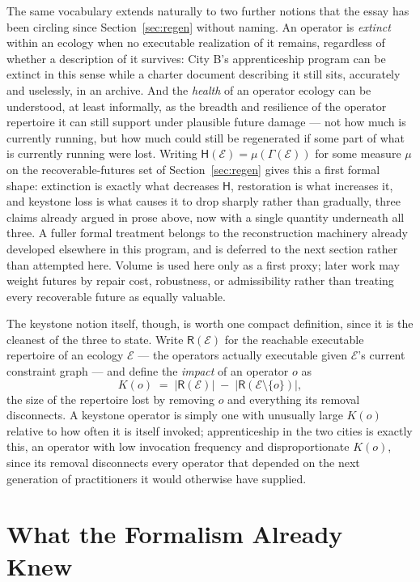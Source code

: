\documentclass[11pt]{article}
\newcommand{\Ecol}{\mathcal{E}}
\newcommand{\Reach}{\mathsf{R}}
\newcommand{\Fut}{\Gamma}
\newcommand{\Health}{\mathsf{H}}
\begin{document}
The same vocabulary extends naturally to two further notions that the
essay has been circling since Section~\ref{sec:regen} without naming.
An operator is \emph{extinct} within an ecology when no executable
realization of it remains, regardless of whether a description of it
survives: City B's apprenticeship program can be extinct in this
sense while a charter document describing it still sits, accurately
and uselessly, in an archive. And the \emph{health} of an operator
ecology can be understood, at least informally, as the breadth and
resilience of the operator repertoire it can still support under
plausible future damage --- not how much is currently running, but
how much could still be regenerated if some part of what is currently
running were lost. Writing $\Health(\Ecol)=\mu(\Fut(\Ecol))$ for some
measure $\mu$ on the recoverable-futures set of
Section~\ref{sec:regen} gives this a first formal shape: extinction
is exactly what decreases $\Health$, restoration is what increases
it, and keystone loss is what causes it to drop sharply rather than
gradually, three claims already argued in prose above, now with a
single quantity underneath all three. A fuller formal treatment
belongs to the reconstruction machinery already developed elsewhere
in this program, and is deferred to the next section rather than
attempted here. Volume is used here only as a first proxy; later work
may weight futures by repair cost, robustness, or admissibility
rather than treating every recoverable future as equally valuable.

The keystone notion itself, though, is worth one compact definition,
since it is the cleanest of the three to state. Write $\Reach(\Ecol)$
for the reachable executable repertoire of an ecology $\Ecol$ ---
the operators actually executable given $\Ecol$'s current constraint
graph --- and define the \emph{impact} of an operator $o$ as
\[
K(o) \;=\; \bigl|\Reach(\Ecol)\bigr| \;-\; \bigl|\Reach(\Ecol\setminus\{o\})\bigr|,
\]
the size of the repertoire lost by removing $o$ and everything its
removal disconnects. A keystone operator is simply one with unusually
large $K(o)$ relative to how often it is itself invoked; apprenticeship
in the two cities is exactly this, an operator with low invocation
frequency and disproportionate $K(o)$, since its removal disconnects
every operator that depended on the next generation of practitioners
it would otherwise have supplied.

\section{What the Formalism Already Knew}\label{sec:reveal}
\end{document}
